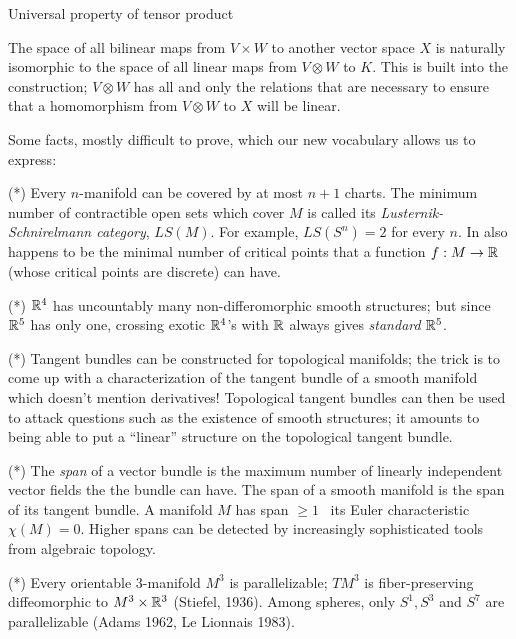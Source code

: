 Universal property of tensor product

The space of all bilinear maps from $V\times W$ to another vector space $X$ is naturally 
isomorphic to the space of all linear maps from $V \otimes W$ to $K$. This is built 
into the construction; $V\otimes W$ has all and only the relations that are necessary 
to ensure that a homomorphism from $V\otimes W$ to $X$ will be linear.

\bsk

\noindent Some facts, mostly difficult to prove, which our new vocabulary allows us to express:

\msk

\noindent (*) Every $n$-manifold can be covered by at most $n+1$ charts. The minimum number of contractible 
open sets which cover $M$ is
called its {\it Lusternik-Schnirelmann category}, $LS(M)$. For example, $LS(S^n)=2$ for every $n$.
In also happens to be the minimal number of critical points that a function $f:M\rightarrow {\Bbb R}$
(whose critical points are discrete) can have.

\ssk

\noindent (*) ${\Bbb R}^4$ has uncountably many non-differomorphic smooth structures; but since ${\Bbb R}^5$
has only one, crossing exotic ${\Bbb R}^4$'s with ${\Bbb R}$ always gives {\it standard} ${\Bbb R}^5$.

\ssk

\noindent (*) Tangent bundles can be constructed for topological manifolds; the trick is to come up
with a characterization of the tangent bundle of a smooth manifold which doesn't mention
derivatives! Topological tangent bundles can then be used to attack questions such as
the existence of smooth structures; it amounts to being able to put a ``linear'' 
structure on the topological tangent bundle. 

\ssk

\noindent (*) The {\it span} of a vector bundle is the maximum number of linearly independent vector fields
the the bundle can have. The span of a smooth manifold is the span of its tangent bundle.
A manifold $M$ has span $\geq 1$ \lra\ its Euler characteristic $\chi(M)=0$. Higher spans can
be detected by increasingly sophisticated tools from algebraic topology.

\ssk

\noindent (*) Every orientable $3$-manifold $M^3$ is parallelizable; $TM^3$ is fiber-preserving diffeomorphic to
$M^3\times {\Bbb R}^3$ (Stiefel, 1936). Among spheres, only $S^1,S^3$ and $S^7$ are parallelizable
(Adams 1962, Le Lionnais 1983).

